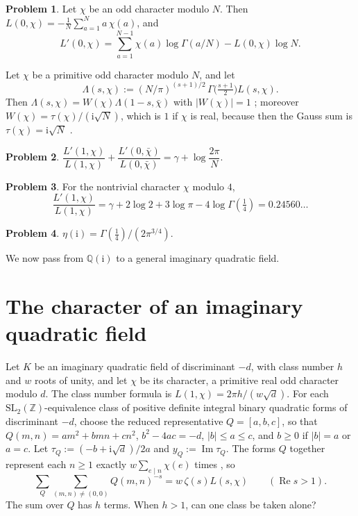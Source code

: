 \documentclass[reqno]{amsart}
\theoremstyle{definition}
\newtheorem{problem}{Problem}[section]
\theoremstyle{plain}
\newcommand{\Z}{\mathbb{Z}}
\newcommand{\Q}{\mathbb{Q}}
\newcommand{\ii}{\mathrm{i}}
\begin{document}
\begin{problem}\label{pr:L0}
Let \(\chi\) be an odd character modulo \(N\).  Then \(L(0, \chi) = -\frac1N \sum_{a=1}^{N} a\,\chi(a)\), and
\[
  L'(0, \chi) = \sum_{a=1}^{N-1} \chi(a) \log\Gamma(a/N) - L(0, \chi) \log N .
\]
\end{problem}

Let \(\chi\) be a primitive odd character modulo \(N\), and let
\[
  \Lambda(s, \chi) := (N/\pi)^{(s+1)/2}\, \Gamma\bigl(\tfrac{s+1}{2}\bigr) L(s, \chi) .
\]  Then \(\Lambda(s, \chi) = W(\chi)\Lambda(1 - s, \bar\chi)\) with \(\lvert W(\chi)\rvert = 1\) \cite[Ch.~9]{Dav}; moreover \(W(\chi) = \tau(\chi)/(\ii\sqrt N)\), which is \(1\) if \(\chi\) is real, because then the Gauss sum is \(\tau(\chi) = \ii\sqrt N\) \cite[Ch.~6]{Dav}.

\begin{problem}\label{pr:FE}
\(\dfrac{L'(1, \chi)}{L(1, \chi)} + \dfrac{L'(0, \bar\chi)}{L(0, \bar\chi)} = \gamma + \log\dfrac{2\pi}{N}\).
\end{problem}

\begin{problem}\label{pr:LL4}
For the nontrivial character \(\chi\) modulo \(4\),
\[
  \frac{L'(1, \chi)}{L(1, \chi)} = \gamma + 2\log 2 + 3\log\pi - 4\log\Gamma(\tfrac14) = 0.24560\ldots
\]
\end{problem}

\begin{problem}\label{pr:eta-i}
\(\eta(\ii) = \Gamma(\frac14)/(2\pi^{3/4})\).
\end{problem}

We now pass from \(\Q(\ii)\) to a general imaginary quadratic field.

\section{The character of an imaginary quadratic field}\label{sec:general}

Let \(K\) be an imaginary quadratic field of discriminant \(-d\), with class number \(h\) and \(w\) roots of unity, and let \(\chi\) be its character, a primitive real odd character modulo \(d\).  The class number formula is \(L(1, \chi) = 2\pi h/(w\sqrt d)\).  For each \(\mathrm{SL}_2(\Z)\)-equivalence class of positive definite integral binary quadratic forms of discriminant \(-d\), choose the reduced representative \(Q = [a, b, c]\), so that \(Q(m,n) = am^2 + bmn + cn^2\), \(b^2 - 4ac = -d\), \(\lvert b\rvert \le a \le c\), and \(b \ge 0\) if \(\lvert b\rvert = a\) or \(a = c\).  Let \(\tau_Q := (-b + \ii\sqrt d)/2a\) and \(y_Q := \operatorname{Im}\tau_Q\).  The forms \(Q\) together represent each \(n \ge 1\) exactly \(w \sum_{e \mid n} \chi(e)\) times \cite[Ch.~6]{Dav}, so
\[
  \sum_Q \sum_{(m,n) \ne (0,0)} Q(m,n)^{-s} = w\, \zeta(s) L(s, \chi)
  \qquad (\operatorname{Re} s > 1) .
\]
The sum over \(Q\) has \(h\) terms.  When \(h > 1\), can one class be taken alone?
\end{document}
